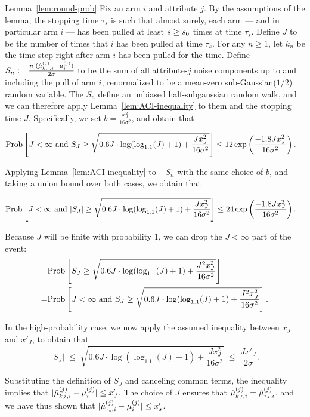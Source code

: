 \begin{extraproof}{Lemma~\ref{lem:round-prob}}
Fix an arm $i$ and attribute $j$.
By the assumptions of the lemma,
the stopping time $\tau_s$ is such that almost surely,
each arm --- and in particular arm $i$ --- has been pulled at least
$s \geq s_0$ times at time $\tau_s$.
Define $J$ to be the number of times that $i$ has been pulled at
time $\tau_s$.
For any $n \geq 1$, let $k_n$ be the time step right after arm $i$ has
been pulled for the  time. Define
$S_n := \frac{n \cdot (\hat{\mu}_{k_n,i}^{(j)} - \mu_{i}^{(j)})}{2 \sigma}$
to be the sum of all attribute-$j$ noise components up to and
including the  pull of arm $i$,
renormalized to be a mean-zero sub-Gaussian($1/2$) random variable.
The $S_n$ define an unbiased half-subgaussian random walk,
and we can therefore apply Lemma~\ref{lem:ACI-inequality} to them and
the stopping time $J$.
Specifically, we set $b = \frac{x_J^2}{16 \sigma^2}$,
and obtain that

\begin{align*}
\Prob{J < \infty \mbox{ and } S_J \geq 
\sqrt{0.6 J \cdot \log (\log_{1.1}(J) + 1) + \frac{J x_J^2}{16 \sigma^2}}}
& \leq 12 \exp \left( \frac{-1.8 J x_J^2}{16 \sigma^2} \right).
\end{align*}

Applying Lemma~\ref{lem:ACI-inequality} to $-S_n$ with the same choice
of $b$, and taking a union bound over both cases, we obtain that

\begin{align*}
\Prob{J < \infty \mbox{ and } |S_J| \geq 
\sqrt{0.6 J \cdot \log (\log_{1.1}(J) + 1) + \frac{J x_J^2}{16 \sigma^2}}}
& \leq 24 \exp \left( \frac{-1.8 J x_J^2}{16 \sigma^2} \right).
\end{align*}

Because $J$ will be finite with probability 1, we can drop the
$J < \infty$ part of the event:
\begin{align*}
& \Prob{S_J \geq 
\sqrt{0.6 J \cdot \log (\log_{1.1}(J) + 1) + \frac{J^2 x_J^2}{16
    \sigma^2}}}\\
= & \Prob{J < \infty \mbox{ and } S_J \geq 
\sqrt{0.6 J \cdot \log (\log_{1.1}(J) + 1) + \frac{J^2 x_J^2}{16
    \sigma^2}}}.
\end{align*}

In the high-probability case, we now apply the assumed inequality
between $x_J$ and $x'_J$, to obtain that
\[
|S_J| \; \leq \;
\sqrt{0.6 J \cdot \log (\log_{1.1}(J) + 1) + \frac{J x_J^2}{16 \sigma^2}}
\; \leq \; \frac{J x'_J}{2 \sigma}.
\]

Substituting the definition of $S_J$ and canceling common terms,
the inequality implies that
$|\hat{\mu}_{k_J,i}^{(j)} - \mu_{i}^{(j)}| \leq x'_J$.
The choice of $J$ ensures that
$\hat{\mu}_{k_J,i}^{(j)} = \hat{\mu}_{\tau_s,i}^{(j)}$,
and we have thus shown that
$|\hat{\mu}_{\tau_s,i}^{(j)} - \mu_{i}^{(j)}| \leq x'_s$.
\end{extraproof}




